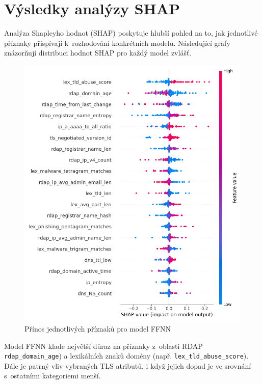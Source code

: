 \chapter{Výsledky analýzy SHAP}
\label{sec:appendix-shap}

Analýza Shapleyho hodnot (SHAP) poskytuje hlubší pohled na to, jak jednotlivé příznaky přispívají k~rozhodování konkrétních modelů. Následující grafy znázorňují distribuci hodnot SHAP pro každý model zvlášť.

\begin{figure}[!ht]
    \centering
    \includegraphics[width=1.0\textwidth]{obrazky-figures/shap_feedforward.png}
    \caption{Přínos jednotlivých příznaků pro model FFNN}
    \label{fig:shap_feedforward}
\end{figure}

Model FFNN klade největší důraz na příznaky z~oblasti RDAP  \texttt{rdap\_domain\_age}) a lexikálních znaků domény (např. \texttt{lex\_tld\_abuse\_score}). Dále je patrný vliv vybraných TLS atributů, i když jejich dopad je ve srovnání s~ostatními kategoriemi menší.

